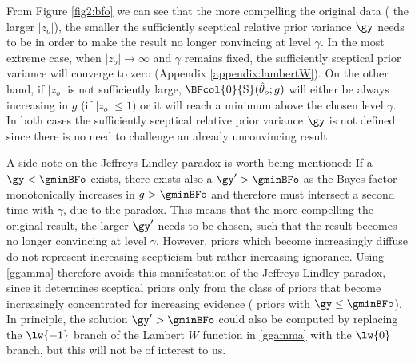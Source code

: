 From Figure \ref{fig2:bfo} we can see that the more compelling the original data
(\ie{} the larger $|z_o|$), the smaller the sufficiently sceptical relative prior
variance $\gy$ needs to be in order to make the result no longer convincing at
level $\gamma$. In the most extreme case, when $|z_{o}| \to \infty$ and $\gamma$
remains fixed, the sufficiently sceptical prior variance will converge to
zero (Appendix \ref{appendix:lambertW}). On the other hand, if $|z_o|$ is not
sufficiently large, $\BFcol{0}{\mathrm{S}}(\hat{\theta}_o; g)$ will either be
always increasing in $g$ (if $|z_o| \leq 1$) or it will reach a minimum above
the chosen level $\gamma$. In both cases the sufficiently sceptical relative
prior variance $\gy$ is not defined since there is no need to challenge an
already unconvincing result.

A side note on the Jeffreys-Lindley paradox is worth being mentioned: If a
$\gy < \gminBFo$ exists, there exists also a $\gy^\prime > \gminBFo$ as the
Bayes factor monotonically increases in $g > \gminBFo$ and therefore must
intersect a second time with $\gamma$, due to the paradox. This means that the
more compelling the original result, the larger $\gy^\prime$ needs to be chosen,
such that the result becomes no longer convincing at level $\gamma$. However,
priors which become increasingly diffuse do not represent increasing scepticism
but rather increasing ignorance. Using \eqref{ggamma} therefore avoids this
manifestation of the Jeffreys-Lindley paradox, since it determines sceptical
priors only from the class of priors that become increasingly concentrated for
increasing evidence (\ie{} priors with $\gy \leq \gminBFo$). In principle, the
solution $\gy^\prime > \gminBFo $ could also be computed by replacing the
$\lw{-1}$ branch of the Lambert $W$ function in \eqref{ggamma} with the $\lw{0}$
branch, but this will not be of interest to us.



